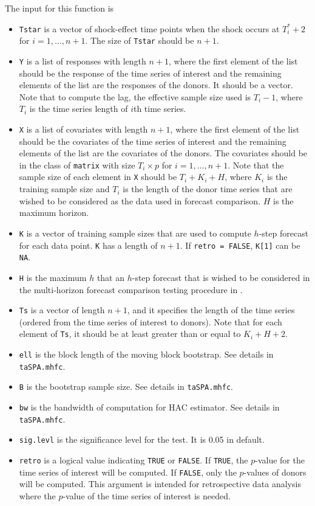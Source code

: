 \documentclass[12pt]{article}
\begin{document}
 The input for this function is
\begin{itemize}
	\item \texttt{Tstar} is a vector of shock-effect time points when the shock occurs at $T^*_i+2$ for $i = 1, \ldots, n+1$. The size of \texttt{Tstar} should be $n+1$. 
	\item \texttt{Y} is a list of responses with length $n +1$,  where the first element of the list should be the response of the time series of interest and the remaining elements of the list are the responses of the donors. It should be a vector.  Note  that to compute the lag, the effective sample size used is $T_i - 1$, where $T_i$ is the time series length of $i$th time series.
	\item \texttt{X} is a list of covariates with length $n+1$, where the first element of the list should be the covariates of the time series of interest and the remaining elements of the list are the covariates of the donors. The covariates should be in the class of \texttt{matrix} with size $T_i\times p$ for $i = 1, \ldots, n+1$. Note that the sample size of each element  in \texttt{X} should be  $T_i+ K_i + H$, where $K_i$ is the training sample size and $T_i$ is the length of the donor time series that are wished to be considered as the data used in forecast comparison. $H$ is the maximum horizon.
	\item \texttt{K} is a vector of training sample sizes that are used to compute $h$-step forecast for each data point. \texttt{K} has a length of $n+1$. If \texttt{retro = FALSE}, \texttt{K[1]} can be \texttt{NA}.
	\item \texttt{H} is the maximum $h$ that an $h$-step forecast that is wished to be considered in the multi-horizon forecast comparison testing procedure in .
	\item \texttt{Ts} is a vector of length $n+1$, and it specifies the length of the time series (ordered from the time series of interest to donors). Note that for each element of \texttt{Ts}, it should be at least greater than or equal to $K_i + H + 2$.
	\item \texttt{ell} is the block length of the moving block bootstrap. See details in \texttt{taSPA.mhfc}.
	\item \texttt{B} is the bootstrap sample size. See details in \texttt{taSPA.mhfc}.
	\item \texttt{bw} is the bandwidth of computation for HAC estimator. See details in \texttt{taSPA.mhfc}.
	\item \texttt{sig.levl} is the significance level for the test. It is 0.05 in default.
	\item \texttt{retro} is a logical value indicating \texttt{TRUE} or \texttt{FALSE}. If  \texttt{TRUE}, the $p$-value for the time series of interest will be computed. If  \texttt{FALSE}, only the $p$-values of donors will be computed. This argument is intended for retrospective data analysis where the $p$-value of the time series of interest is needed.
\end{itemize}
 
\end{document}
